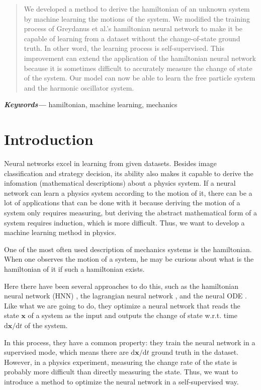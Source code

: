 \documentclass{article}
\providecommand{\keywords}[1]
{
  \small	
  \textbf{\textit{Keywords---}} #1
}
\begin{document}
\begin{abstract}
We developed a method to derive the hamiltonian of an unknown system by machine learning the motions of the system.
We modified the training process of Greydanus et al.'s hamiltonian neural network
to make it be capable of learning from a dataset without the change-of-state ground truth.
In other word, the learning process is self-supervised.
This improvement can extend the application of the hamiltonian neural network
because it is sometimes difficult to accurately measure the change of state of the system.
Our model can now be able to learn the free particle system
and the harmonic oscillator system.
\end{abstract}

\keywords{hamiltonian, machine learning, mechanics}

\tableofcontents

\section{Introduction}

Neural networks excel in learning from given datasets.
Besides image classification and strategy decision,
its ability also makes it capable to derive the infomation (mathematical descriptions) about a physics system.
If a neural network can learn a physics system according to the motion of it,
there can be a lot of applications that can be done with it
because deriving the motion of a system only requires measuring,
but deriving the abstract mathematical form of a system requires induction,
which is more difficult.
Thus, we want to develop a machine learning method in physics.

One of the most often used description of mechanics systems is the hamiltonian.
When one observes the motion of a system,
he may be curious about what is the hamiltonian of it
if such a hamiltonian exists.

Here there have been several approaches to do this,
such as the hamiltonian neural network (HNN) \cite{greydanus2019hamiltonian},
the lagrangian neural network \cite{cranmer2020lagrangian},
and the neural ODE \cite{chen2018ode}.
Like what we are going to do,
they optimize a neural network that reads the state $\mathbf x$ of a system as the input
and outputs the change of state w.r.t. time $\mathrm d\mathbf x/\mathrm dt$ of the system.

In this process, they have a common property:
they train the neural network in a supervised mode,
which means there are $\mathrm d\mathbf x/\mathrm dt$ ground truth in the dataset.
However, in a physics experiment, measuring the change rate of the state is probably more difficult than directly measuring the state.
Thus, we want to introduce a method to optimize the neural network in a self-supervised way.
\end{document}
